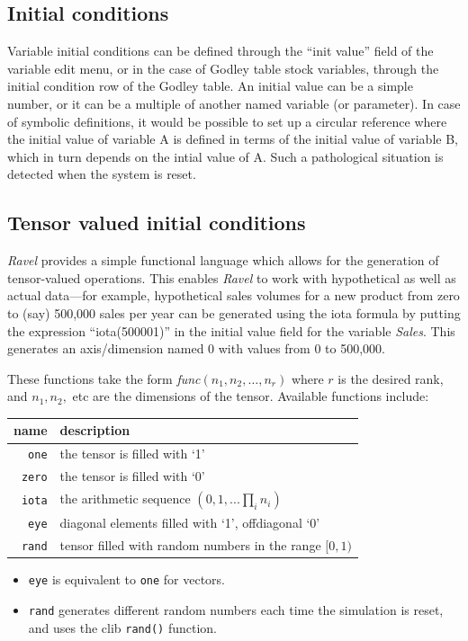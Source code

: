\subsection{Initial conditions}

\label{var:init}

Variable initial conditions can be defined through the ``init value''
field of the variable edit menu, or in the case of Godley table stock
variables, through the initial condition row of the Godley table.
An initial value can be a simple number, or it can be a multiple of
another named variable (or parameter). In case of symbolic definitions,
it would be possible to set up a circular reference where the initial
value of variable A is defined in terms of the initial value of variable
B, which in turn depends on the intial value of A. Such a pathological
situation is detected when the system is reset.

\subsection{Tensor valued initial conditions}

\label{tensor-init}

\emph{Ravel} provides a simple functional language which allows for
the generation of tensor-valued operations. This enables \emph{Ravel}
to work with hypothetical as well as actual data---for example, hypothetical
sales volumes for a new product from zero to (say) 500,000 sales per
year can be generated using the iota formula by putting the expression
``iota(500001)'' in the initial value field for the variable \emph{Sales}.
This generates an axis/dimension named 0 with values from 0 to 500,000. 

These functions take the form {\em func}$(n_{1},n_{2},\ldots,n_{r})$
where $r$ is the desired rank, and $n_{1},n_{2},$ etc are the dimensions
of the tensor. Available functions include:

\begin{tabular}{|r|l|}
\hline 
name  & description\tabularnewline
\hline 
\verb+one+ & the tensor is filled with `1'\tabularnewline
\verb+zero+ & the tensor is filled with `0'\tabularnewline
\verb+iota+ & the arithmetic sequence $(0,1,...\prod_{i}n_{i})$\tabularnewline
\verb+eye+ & diagonal elements filled with `1', offdiagonal `0'\tabularnewline
\verb+rand+ & tensor filled with random numbers in the range $[0,1)$\tabularnewline
\hline 
\end{tabular}
\begin{itemize}
\item \verb+eye+ is equivalent to \verb+one+ for vectors. 
\item \verb+rand+ generates different random numbers each time the simulation
is reset, and uses the clib \verb+rand()+ function. 
\end{itemize}

